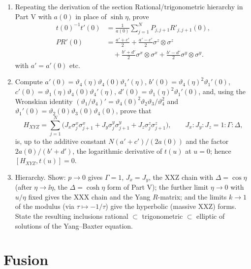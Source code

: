 \begin{exercise}
\leavevmode\par
\begin{enumerate}[label=(\alph*)]
\item Repeating the derivation of the section Rational/trigonometric
hierarchy in Part V with $a(0)$ in place of $\sinh\eta$, prove
\[
\begin{aligned}
 t(0)^{-1}t'(0)&=\frac1{a(0)}\sum_{j=1}^NP_{j,j+1}R'_{j,j+1}(0),\\
 P R'(0)&=\frac{a'+c'}2+\frac{a'-c'}2\sigma^z\otimes\sigma^z\\
 &\quad+\frac{b'+d'}2\sigma^x\otimes\sigma^x
       +\frac{b'-d'}2\sigma^y\otimes\sigma^y .
\end{aligned}
\]
with $a'=a'(0)$ etc.
\item Compute $a'(0)=\vartheta_4(\eta)\vartheta_4(0)\vartheta_1'(\eta)$,
$b'(0)=\vartheta_4(\eta)^2\vartheta_1'(0)$, $c'(0)=\vartheta_1(\eta)\vartheta_4(0)\vartheta_4'(\eta)$,
$d'(0)=\vartheta_1(\eta)^2\vartheta_1'(0)$, and, using the Wronskian identity
$(\vartheta_1/\vartheta_4)'=\vartheta_4(0)^2\vartheta_2\vartheta_3/\vartheta_4^2$
and $\vartheta_1'(0)=\vartheta_2(0)\vartheta_3(0)\vartheta_4(0)$, prove that
\[
 H_{XYZ}=\sum_{j=1}^N\big(J_x\sigma^x_j\sigma^x_{j+1}+J_y\sigma^y_j\sigma^y_{j+1}+J_z\sigma^z_j\sigma^z_{j+1}\big),
 \qquad J_x:J_y:J_z=1:\Gamma:\Delta,
\]
is, up to the additive constant $N(a'+c')/(2a(0))$ and the factor
$2a(0)/(b'+d')$, the logarithmic derivative of $t(u)$ at $u=0$; hence
$[H_{XYZ},t(u)]=0$.
\item Hierarchy.  Show: $p\to0$ gives $\Gamma=1$, $J_x=J_y$, the XXZ chain
with $\Delta=\cos\eta$ (after $\eta\to\ii\eta$, the $\Delta=\cosh\eta$
form of Part V); the further limit $\eta\to0$ with $u/\eta$ fixed gives the
XXX chain and the Yang $R$-matrix; and the limits $k\to1$ of the modulus
(via $\tau\mapsto-1/\tau$) give the hyperbolic (massive XXZ) forms.  State
the resulting inclusions rational $\subset$ trigonometric $\subset$
elliptic of solutions of the Yang--Baxter equation.
\end{enumerate}
\end{exercise}

\section{Fusion}

